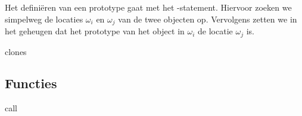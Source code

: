 Het definiëren van een prototype gaat met het \CLONES-statement. Hiervoor zoeken we simpelweg de locaties $\omega_i$ en $\omega_j$ van de twee objecten op. Vervolgens zetten we in het geheugen dat het prototype van het object in $\omega_i$ de locatie $\omega_j$ is.

\begin{NSAxiom}{clones}
  \begin{prooftree}
  \end{prooftree}
  \begin{NSConditions}
  \end{NSConditions}
\end{NSAxiom}

\subsection{Functies}

\begin{NSAxiom}{call}
  \begin{prooftree}
  \end{prooftree}
  \begin{NSConditions}
  \end{NSConditions}
\end{NSAxiom}


